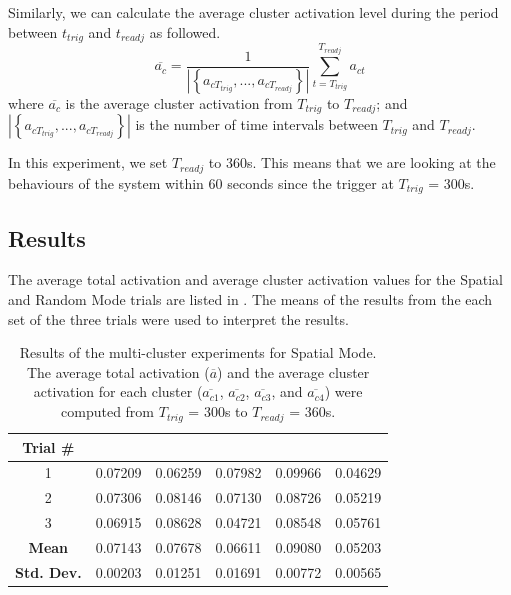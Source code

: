 Similarly, we can calculate the average cluster activation level during the period between $t_{trig}$ and $t_{readj}$ as followed.
\begin{equation}\label{eqn:average_cluster_activation}
\overline{a_c} = \frac{1}{| \left\{ a_{cT_{trig}}, ... , a_{cT_{readj}} \right\}|} \sum_{t=T_{trig}}^{T_{readj}} a_{ct}
\end{equation}
where $\overline{a_c}$ is the average cluster activation from $T_{trig}$ to $T_{readj}$; and $| \left\{ a_{cT_{trig}}, ..., a_{cT_{readj}} \right\}|$ is the number of time intervals between $T_{trig}$ and $T_{readj}$.

In this experiment, we set $T_{readj}$ to 360s. This means that we are looking at the behaviours of the system within 60 seconds since the trigger at $T_{trig}$ = 300s.

\subsection{Results}

The average total activation and average cluster activation values for the Spatial and Random Mode trials are listed in . The means of the results from the each set of the three trials were used to interpret the results. 

\begin{table}[!htb]
	\caption[Results of the multi-cluster experiment for Spatial Mode]{Results of the multi-cluster experiments for Spatial Mode. The average total activation ($\overline{a}$) and the average cluster activation for each cluster ($\overline{a_{c1}}$, $\overline{a_{c2}}$, $\overline{a_{c3}}$, and $\overline{a_{c4}}$) were computed from $T_{trig}$ = 300s to  $T_{readj}$ = 360s.}
	\begin{center}
		\begin{tabular}{ | c | c | c | c | c | c |} 
			\hline
			\textbf{Trial \#} & \boldmath{$\overline{a}$}  & \boldmath{$\overline{a_{c1}}$}  & \boldmath{$\overline{a_{c2}}$} & \boldmath{$\overline{a_{c3}}$} & \boldmath{$\overline{a_{c4}}$} \\ 
			\hline
			\hline
			1 & 0.07209 & 0.06259 & 0.07982 & 0.09966 & 0.04629 \\
			\hline
			2 & 0.07306 & 0.08146 & 0.07130 & 0.08726 & 0.05219 \\
			\hline
			3 & 0.06915 & 0.08628 & 0.04721 & 0.08548 & 0.05761 \\
			\hlineB{3}	
			\textbf{Mean} & 0.07143	 & 0.07678 & 0.06611 & 0.09080 & 0.05203 \\
			\hline
			\textbf{Std. Dev.} & 0.00203 & 0.01251 & 0.01691 & 0.00772 & 0.00565 \\
			\hline			
		\end{tabular}
	\end{center}
	\label{table:multi-cluster-results-spatial}
\end{table}

